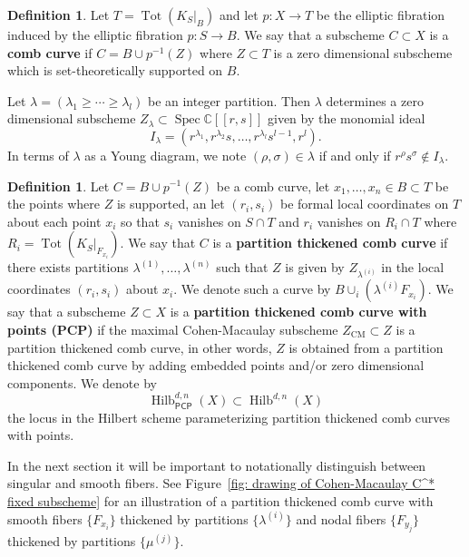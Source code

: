 \documentclass[12pt]{amsart}
\theoremstyle{definition}
\newtheorem{definition}[theorem]{Definition}
\newcommand{\CC} {\mathbb{C}}          %
\newcommand{\Hilb}{\operatorname{Hilb}}
\newcommand{\Tot}{\operatorname{Tot}}
\newcommand{\CM}{\operatorname{CM}}
\newcommand{\Spec}{\operatorname{Spec}}
\newcommand{\PCP}{\mathsf{PCP}}
\begin{document}
\begin{definition}\label{defn: comb curves} 
Let $T=\Tot(K_{S}|_{B})$ and let $p:X\to T$ be the elliptic fibration
induced by the elliptic fibration $p:S\to B$. We say that a subscheme $C\subset
X$ is a \textbf{comb curve} if $C=B\cup p^{-1}(Z) $ where $Z\subset T$
is a zero dimensional subscheme which is set-theoretically supported on
$B$.
\end{definition}

Let $\lambda =(\lambda_{1}\geq \dotsb \geq \lambda_{l}) $ be an
integer partition. Then $\lambda$ determines a zero dimensional subscheme
$Z_{\lambda}\subset \Spec \CC [[r,s]]$ given by the monomial ideal
\begin{equation}\label{eqn: monomial ideal I given by a partition lambda}
I_{\lambda}=(r^{\lambda_{1}},r^{\lambda_{2}}s,\dotsc
,r^{\lambda_{l}}s^{l-1},r^{l}).
\end{equation}
In terms of $\lambda$ as a Young diagram, we note $(\rho ,\sigma)\in
\lambda$ if and only if $r^{\rho}s^{\sigma}\notin I_{\lambda}.$

\begin{definition}\label{defn: partition thickened comb curve}
Let $C=B\cup p^{-1}(Z)$ be a comb curve, let $x_{1},\dotsc ,x_{n}\in
B\subset T$ be the points where $Z$ is supported, an let
$(r_{i},s_{i})$ be formal local coordinates on $T$ about each point
$x_{i}$ so that $s_{i}$ vanishes on $S\cap T$ and $r_{i}$
vanishes on $R_{i}\cap T$ where $R_{i}=\Tot (K_{S}|_{F_{x_{i}}})$. We
say that $C$ is a \textbf{partition thickened comb curve} if there
exists partitions $\lambda^{(1)},\dotsc ,\lambda^{(n)}$ such that $Z$
is given by $Z_{\lambda^{(i)}}$ in the local coordinates
$(r_{i},s_{i})$ about $x_{i}$. We denote such a curve by
$B\cup_{i}\left(\lambda^{(i)}F_{x_{i}} \right)$. We say that a
subscheme $Z\subset X$ is a \textbf{partition thickened comb curve
with points (PCP)} if the maximal Cohen-Macaulay subscheme
$Z_{\CM}\subset Z$ is a partition thickened comb curve, in other words,
$Z$ is obtained from a partition thickened comb curve by adding
embedded points and/or zero dimensional components. We denote by
\[
\Hilb^{d,n}_{\PCP}(X)\subset \Hilb^{d,n}(X)
\]
the locus in the Hilbert scheme parameterizing partition thickened
comb curves with points.
\end{definition}

In the next section it will be important to notationally distinguish
between singular and smooth fibers. See Figure~\ref{fig: drawing of
Cohen-Macaulay C^* fixed subscheme} for an illustration of a partition
thickened comb curve with smooth fibers $\{F_{x_{i}} \}$ thickened by
partitions $\{\lambda^{(i)} \}$ and nodal fibers  $\{F_{y_{j}} \}$ thickened by
partitions $\{\mu^{(j)} \}$.
\end{document}

